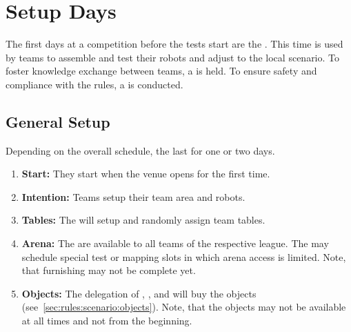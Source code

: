 \chapter{Setup Days}
\label{chap:setupdays}
The first days at a \RoboCup\AtHome{} competition before the tests start are the \SetupDays{}. This time is used by teams to assemble and test their robots and adjust to the local scenario. To foster knowledge exchange between teams, a \PS{} is held. To ensure safety and compliance with the rules, a \RobotInspection{} is conducted.


\section{General Setup}
\label{sec:setupdays:general}
Depending on the overall \RoboCup{} schedule, the \SetupDays{} last for one or two days.

\begin{enumerate}
	\item \textbf{Start:} They start when the venue opens for the first time.
	\item \textbf{Intention:} Teams setup their team area and robots.
	\item \textbf{Tables:} The  will setup and randomly assign team tables.
	\item \textbf{Arena:} The \Arenas{} are available to all teams of the respective league. The  may schedule special test or mapping slots in which arena access is limited. Note, that furnishing may not be complete yet.
	\item \textbf{Objects:} The delegation of , ,  and  will buy the objects (see~\ref{sec:rules:scenario:objects}). Note, that the objects may not be available at all times and not from the beginning.
\end{enumerate}

